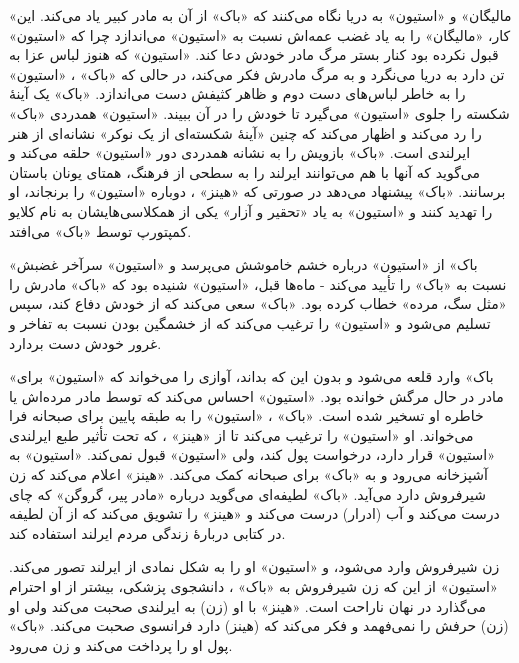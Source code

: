 \documentclass[12pt]{book}
\newcommand{\noun}[1]{«{#1}»}
\begin{document}
    \noun{مالیگان} و \noun{استیون} به دریا نگاه می‌کنند که \noun{باک}  از آن به مادر کبیر یاد می‌کند. این کار، \noun{مالیگان} را به یاد غضب عمه‌اش نسبت به \noun{استیون} می‌اندازد چرا که \noun{استیون} قبول نکرده بود کنار بستر مرگ مادر خودش دعا کند. \noun{استیون} که هنوز لباس عزا به تن دارد به دریا می‌نگرد و به مرگ مادرش فکر می‌کند، در حالی که \noun{باک} ، \noun{استیون} را به خاطر لباس‌‌های دست دوم و ظاهر کثیفش دست می‌اندازد. \noun{باک}  یک آینۀ شکسته را جلوی \noun{استیون} می‌گیرد تا خودش را در آن ببیند. \noun{استیون} همدردی \noun{باک}  را رد می‌کند و اظهار می‌کند که چنین «آینۀ شکسته‌ای از یک نوکر» نشانه‌ای از هنر ایرلندی است. \noun{باک}  بازویش را به نشانه همدردی دور \noun{استیون} حلقه می‌کند و می‌گوید که آنها با هم می‌توانند ایرلند را به سطحی از فرهنگ، همتای یونان باستان برسانند. \noun{باک}  پیشنهاد می‌دهد در صورتی که \noun{هینز} ، دوباره \noun{استیون} را برنجاند، او را تهدید کنند و \noun{استیون} به یاد «تحقیر و آزار» یکی از همکلاسی‌هایشان به نام کلایو کمپتورپ توسط \noun{باک}  می‌افتد.

    \noun{باک}  از \noun{استیون} درباره خشم خاموشش می‌پرسد و \noun{استیون} سرآخر غضبش نسبت به \noun{باک}  را تأیید می‌کند - ماه‌ها قبل، \noun{استیون} شنیده بود که \noun{باک}  مادرش را «مثل سگ، مرده» خطاب کرده بود. \noun{باک}  سعی می‌کند که از خودش دفاع کند، سپس تسلیم می‌شود و \noun{استیون} را ترغیب می‌کند که از خشمگین بودن نسبت به تفاخر و غرور خودش دست بردارد.

    \noun{باک}  وارد قلعه می‌شود و بدون این که بداند، آوازی را می‌خواند که \noun{استیون} برای مادر در حال مرگش خوانده بود. \noun{استیون} احساس می‌کند که توسط مادر مرده‌اش یا خاطره او تسخیر شده است. \noun{باک} ، \noun{استیون} را به طبقه پایین برای صبحانه فرا می‌خواند. او \noun{استیون} را ترغیب می‌کند تا از \noun{هینز} ، که تحت تأثیر طبع ایرلندی \noun{استیون} قرار دارد، درخواست پول کند، ولی \noun{استیون} قبول نمی‌کند. \noun{استیون} به آشپزخانه می‌رود و به \noun{باک}  برای صبحانه کمک می‌کند. \noun{هینز}  اعلام می‌کند که زن شیرفروش دارد می‌آید. \noun{باک}  لطیفه‌ای می‌گوید درباره «مادر پیر، گروگن» که چای درست می‌کند و آب (ادرار) درست می‌کند و \noun{هینز}  را تشویق می‌کند که از آن لطیفه در کتابی دربارۀ زندگی مردم ایرلند استفاده کند.

    زن شیرفروش وارد می‌شود، و \noun{استیون} او را به شکل نمادی از ایرلند تصور می‌کند. \noun{استیون} از این که زن شیرفروش به \noun{باک} ، دانشجوی پزشکی، بیشتر از او احترام می‌گذارد در نهان ناراحت است. \noun{هینز}  با او (زن) به ایرلندی صحبت می‌کند ولی او (زن) حرفش را نمی‌فهمد و فکر می‌کند که (هینز) دارد فرانسوی صحبت می‌کند. \noun{باک}  پول او را پرداخت می‌کند و زن می‌رود.
\end{document}
